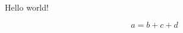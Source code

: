 \documentclass{article}
\begin{document}
Hello world!

\begin{equation}
    a = b + c + d
\end{equation}
\end{document}
